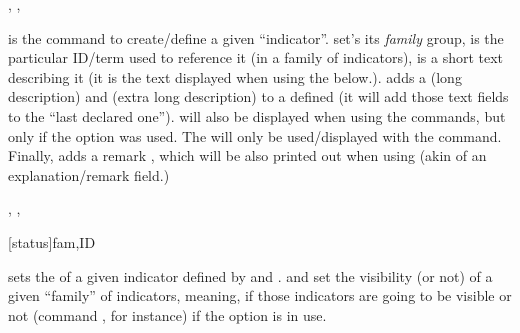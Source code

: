 \documentclass[article,nogeometry,english,tocdepth=3,secdepth=3]{ufrgscca} %
\begin{document}
\begin{codedescribe}{\declareindicator, \indicatorDesc, \indicatorText}
	\begin{codesyntax}%
		\tsobj{\declareindicator}\tsverb{*+}
	\end{codesyntax}
\tsmacro{\declareindicator}{} is the command to create/define a given “indicator”.  set's its \emph{family} group,  is the particular ID/term used to reference it (in a family of indicators),  is a short text describing it (it is the text displayed when using the \tsmacro{\indref}{} below.). \tsmacro{\indicatorDesc}{} adds a  (long description) and  (extra long description) to a defined \tsmacro{\declareindicator}{} (it will add those text fields to the “last declared one”).  will also be displayed when using the \tsmacro{\indref}{} commands, but only if the  option was used. The  will only be used/displayed with the \tsmacro{\PrintIndicators}{} command. Finally, \tsmacro{\indicatorText}{} adds a remark , which will be also printed out when using  \tsmacro{\lstind}{} (akin of an explanation/remark field.)
\end{codedescribe}

\begin{codedescribe}{\indsetstatus, \indsetview, \indsethide}
	\begin{codesyntax}%
	\tsmacro{\indsetstatus}[status]{fam,ID}
	\tsmacro{\indsetview}{fam}
	\tsmacro{\indsethide}{fam}
\end{codesyntax}
 sets the  of a given indicator defined by  and . \tsmacro{\indsetview}{} and  set the visibility (or not) of a given “family” of indicators, meaning, if those indicators are going to be visible or not (command \tsmacro{\indref}{}, for instance) if the option  is in use.
\end{codedescribe}
\end{document}
